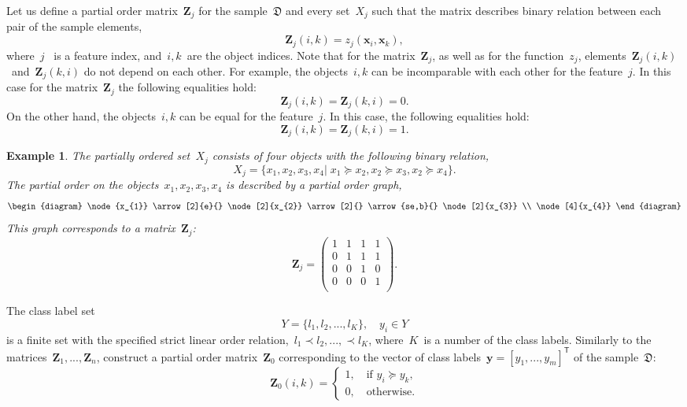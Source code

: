 \documentclass[12pt,preprint]{elsarticle}
\newcommand{\bx}{\mathbf{x}}
\newcommand{\by}{\mathbf{y}}
\newcommand{\bZ}{\mathbf{Z}}
\newcommand{\T}{^{\mathsf{T}}}
\newtheorem{Ex}{Example}
\begin{document}
Let us define a partial order matrix~$\bZ_j$ for the sample~$\mathfrak{D}$ and every set~$X_j$ such that the matrix describes binary relation between each pair of the sample elements,
\[
\bZ_j(i,k) = z_j(\bx_i,\bx_k),
\]
where~$j$~ is a feature index, and~$i,k$~are the object indices.
Note that for the matrix~$\bZ_j$, as well as for the function~$z_j$, elements~$\bZ_j(i,k)$~and~$\bZ_j(k,i)$ do not depend on each other. For example, the objects~$i,k$ can be incomparable with each other for the feature~$j$. In this case for the matrix~$\bZ_j$ the following equalities hold:
\[
\bZ_j(i,k)=\bZ_j(k,i)=0.
\]
On the other hand, the objects~$i,k$ can be equal for the feature~$j$. In this case, the following equalities hold:
\[
\bZ_j(i,k)=\bZ_j(k,i)=1.
\]
\begin{Ex}
The partially ordered set~$X_j$ consists of four objects with the following binary relation,
\[
X_j=\{x_{1},x_{2},x_{3},x_{4}|\;x_{1}\succeq x_{2}, x_{2}\succeq x_{3}, x_{2}\succeq x_{4}\}.
\]
The partial order on the objects~$x_{1},x_{2},x_{3},x_{4}$ is described by a partial order graph,
\[
\begin{diagram}
\node{x_{1}} \arrow[2]{e}{}
\node[2]{x_{2}} \arrow[2]{}
\arrow{se,b}{}
\node[2]{x_{3}} \\
\node[4]{x_{4}}
\end{diagram}
\]
This graph corresponds to a matrix~$\bZ_j$:
\[
\bZ_j=
\begin{pmatrix}
1 & 1 & 1 & 1 \\
0 & 1 & 1 & 1 \\
0 & 0 & 1 & 0 \\
0 & 0 & 0 & 1 \\
\end{pmatrix}.
\]
\label{ex1}
\end{Ex}
The class label set
\begin{equation}
Y=\{l_1,l_2,...,l_K\},\quad y_i\in Y
\label{yValues}
\end{equation}
is a finite set with the specified strict linear order relation,~$l_1\prec l_2,...,\prec l_K$, where~$K$~is a number of the class labels. Similarly to the matrices~$\bZ_1,...,\bZ_n$, construct a partial order matrix~$\bZ_0$ corresponding to the vector of class labels~$\by=[y_1,...,y_m]\T$ of the sample~$\mathfrak{D}$:
\[
\bZ_0(i,k) =
\begin{cases}
1,\quad\text{if } y_i\succeq y_k, \\
0,\quad\text{otherwise}.
\end{cases}
\]
\end{document}
